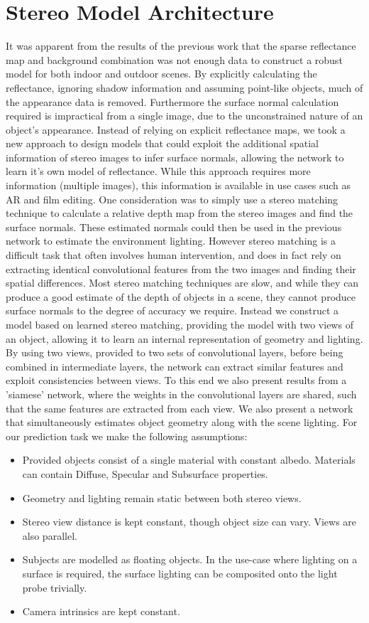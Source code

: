 \documentclass[ %
                    author={Gavin Parker},
                supervisor={Dr. Neill Campbell},
                    degree={MEng},
                     title={Deep Siamese Networks for Illumination Estimation from Stereo Images},
                  subtitle={},
                      type={research},
                      year={2018} ]{dissertation}
\begin{document}
\section{Stereo Model Architecture}
It was apparent from the results of the previous work that the sparse reflectance map and background combination was not enough data to construct a robust model for both indoor and outdoor scenes. By explicitly calculating the reflectance, ignoring shadow information and assuming point-like objects, much of the appearance data is removed. Furthermore the surface normal calculation required is impractical from a single image, due to the unconstrained nature of an object's appearance. Instead of relying on explicit reflectance maps, we took a new approach to design models that could exploit the additional spatial information of stereo images to infer surface normals, allowing the network to learn it's own model of reflectance. While this approach requires more information (multiple images), this information is available in use cases such as AR and film editing. One consideration was to simply use a stereo matching technique to calculate a relative depth map from the stereo images and find the surface normals. These estimated normals could then be used in the previous network to estimate the environment lighting. However stereo matching is a difficult task that often involves human intervention, and does in fact rely on extracting identical convolutional features from the two images and finding their spatial differences. Most stereo matching techniques are slow, and while they can produce a good estimate of the depth of objects in a scene, they cannot produce surface normals to the degree of accuracy we require. Instead we construct a model based on learned stereo matching, providing the model with two views of an object, allowing it to learn an internal representation of geometry and lighting. By using two views, provided to two sets of convolutional layers, before being combined in intermediate layers, the network can extract similar features and exploit consistencies between views. To this end we also present results from a 'siamese' network, where the weights in the convolutional layers are shared, such that the same features are extracted from each view. We also present a network that simultaneously estimates object geometry along with the scene lighting.
\newline
For our prediction task we make the following assumptions:
\begin{itemize}
\item Provided objects consist of a single material with constant albedo. Materials can contain Diffuse, Specular and Subsurface properties.
\item Geometry and lighting remain static between both stereo views.
\item Stereo view distance is kept constant, though object size can vary. Views are also parallel.
\item Subjects are modelled as floating objects. In the use-case where lighting on a surface is required, the surface lighting can be composited onto the light probe trivially.
\item Camera intrinsics are kept constant.
\end{itemize}
\end{document}
